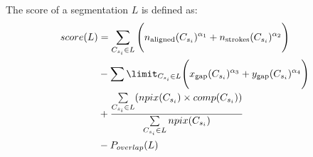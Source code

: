\documentclass{article}
\begin{document}
The score of a segmentation $L$ is defined as:
\begin{align}
score(L) &=\sum\limits_{C_{s_i}\in L}\Bigg{(}n_\text{aligned}(C_{s_i})^{\alpha_{1}}+n_\text{strokes}(C_{s_i})^{\alpha_{2}}\Bigg{)}\\ &-\sum\limit_{C_{s_i}\in L}\Bigg{(}x_\text{gap}(C_{s_i})^{\alpha_3}+y_\text{gap}(C_{s_i})^{\alpha_4}\Bigg{)}\\
&+\frac{\sum\limits_{C_{s_i} \in L} (npix(C_{s_i})\times comp(C_{s_i}))}{\sum\limits_{C_{s_i} \in L}npix(C_{s_i})}\\
&- P_{overlap}(L)
\end{align}


\begin{thebibliography}{}
\bibitem{}
\end{thebibliography}
\end{document}
